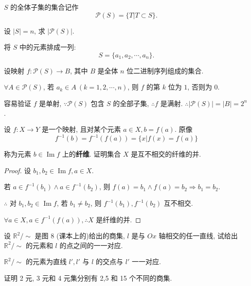 \documentclass{ctexart}
\begin{document}
\begin{exercise}[5.4]
    $S$ 的全体子集的集合记作
    \[\mathcal{P}(S)=\{T|T\subset S\}.\]

    设 $|S|=n$, 求 $|\mathcal{P}(S)|$.
\end{exercise}
\begin{solution}
    将 $S$ 中的元素排成一列:
    \[S=\{a_1,a_2,\cdots,a_n\}.\]

    设映射 $f:\mathcal{P}(S)\to B$, 其中 $B$ 是全体 $n$ 位二进制序列组成的集合.

    $\forall A\in\mathcal{P}(S)$, 若 $a_k\in A\ (k=1,2,\cdots,n)$, 则 $f$ 的第 $k$ 位为 $1$, 否则为 $0$.

    容易验证 $f$ 是单射, $\because\mathcal{P}(S)$ 包含 $S$ 的全部子集, $\therefore f$ 是满射. $\therefore|\mathcal{P}(S)|=|B|=2^n$.
\end{solution}
\begin{exercise}[5.5]
    设 $f:X\to Y$ 是一个映射, 且对某个元素 $a\in X,b=f(a)$. 原像
    \[f^{-1}(b)=f^{-1}(f(a))=\{x|f(x)=f(a)\}\]

    称为元素 $b\in\operatorname{Im}f$ 上的\textbf{纤维}. 证明集合 $X$ 是互不相交的纤维的并.
\end{exercise}
\begin{proof}
    设 $b_1,b_2\in\operatorname{Im}f,a\in X$.

    若 $a\in f^{-1}(b_1)\land a\in f^{-1}(b_2)$, 则 $f(a)=b_1\land f(a)=b_2\Rightarrow b_1=b_2$.

    $\therefore$ 对 $b_1,b_2\in\operatorname{Im}f$, 若 $b_1\neq b_2$, 则 $f^{-1}(b_1),f^{-1}(b_2)$ 互不相交.

    $\forall a\in X,a\in f^{-1}(f(a)),\therefore X$ 是纤维的并.
\end{proof}
\begin{exercise}[6.1]
    设 $\mathbb{R}^2/\sim$ 是图 8 (课本上的)给出的商集, $l$ 是与 $Ox$ 轴相交的任一直线, 试给出 $\mathbb{R}^2/\sim$ 的元素和 $l$ 的点之间的一一对应.
\end{exercise}
\begin{solution}
    $\mathbb{R}^2/\sim$ 的元素为直线 $l',l'$ 与 $l$ 的交点与 $l'$ 一一对应.
\end{solution}
\begin{exercise}[6.2]
    证明 2 元, 3 元和 4 元集分别有 2,5 和 15 个不同的商集.
\end{exercise}
\end{document}
